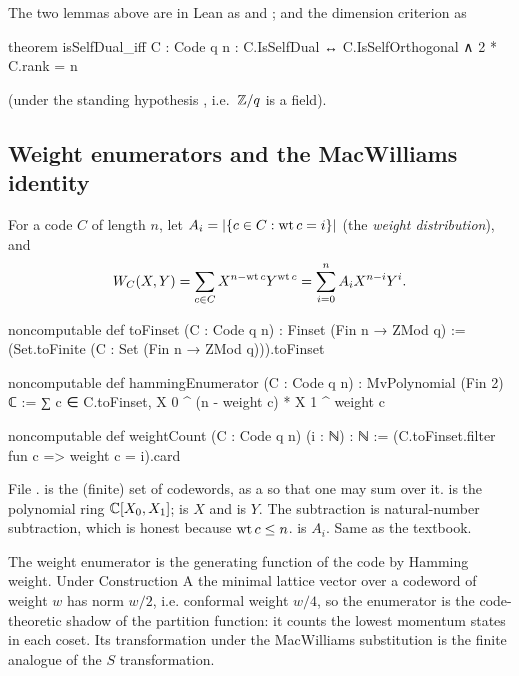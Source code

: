 The two lemmas above are in Lean as  and
; and the dimension criterion as
\begin{leancode}
theorem isSelfDual_iff {C : Code q n} :
    C.IsSelfDual ↔ C.IsSelfOrthogonal ∧ 2 * C.rank = n
\end{leancode}
(under the standing hypothesis , i.e.\ ${\mathbb{Z}}/q$ is a field).

\subsection{Weight enumerators and the MacWilliams identity}\label{ch02:sec:macwilliams}

\begin{definition}
For a code $C$ of length $n$, let $A_i=|\{c\in C:\operatorname{wt} c=i\}|$ (the \emph{weight
distribution}), and
\begin{equation*}
W_C(X,Y)=\sum_{c\in C}X^{n-\operatorname{wt} c}Y^{\operatorname{wt} c}=\sum_{i=0}^nA_iX^{n-i}Y^i .
\end{equation*}
\end{definition}
\begin{leancode}
noncomputable def toFinset (C : Code q n) : Finset (Fin n → ZMod q) :=
  (Set.toFinite (C : Set (Fin n → ZMod q))).toFinset

noncomputable def hammingEnumerator (C : Code q n) : MvPolynomial (Fin 2) ℂ :=
  ∑ c ∈ C.toFinset, X 0 ^ (n - weight c) * X 1 ^ weight c

noncomputable def weightCount (C : Code q n) (i : ℕ) : ℕ :=
  (C.toFinset.filter fun c => weight c = i).card
\end{leancode}
\begin{dictionary}
File .   is the (finite) set of codewords, as a
 so that one may sum over it.   is the polynomial ring
${\mathbb{C}}[X_0,X_1]$;  is $X$ and  is $Y$.  The subtraction  is
natural-number subtraction, which is honest because $\operatorname{wt} c\le n$.   is
$A_i$.  Same as the textbook.
\end{dictionary}
\begin{physics}
The weight enumerator is the generating function of the code by Hamming weight. Under Construction A the minimal lattice vector over a codeword of weight $w$ has norm $w/2$, i.e. conformal weight $w/4$, so the enumerator is the code-theoretic shadow of the partition function: it counts the lowest momentum states in each coset. Its transformation under the MacWilliams substitution is the finite analogue of the $S$ transformation.
\end{physics}

